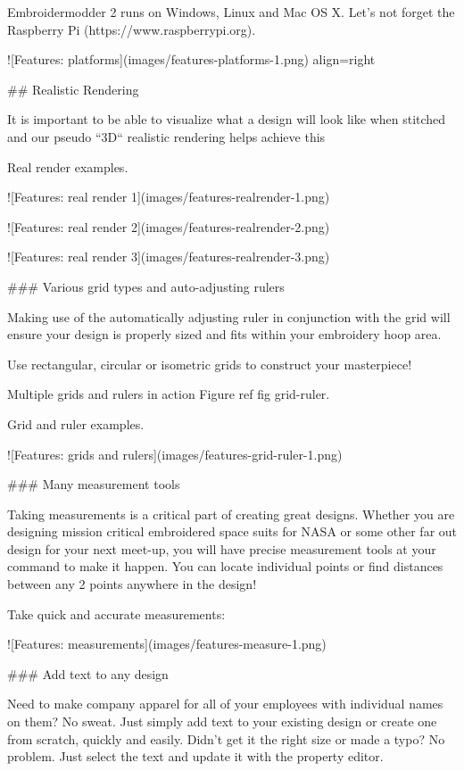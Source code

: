 Embroidermodder 2 runs on Windows, Linux and Mac OS X. Let's not forget the  Raspberry
Pi (https://www.raspberrypi.org).

![Features: platforms](images/features-platforms-1.png){ align=right }

## Realistic Rendering

It is important to be able to visualize what a design will look like when stitched and our
pseudo ``3D`` realistic rendering helps achieve this

Real render examples.

![Features: real render 1](images/features-realrender-1.png)

![Features: real render 2](images/features-realrender-2.png)

![Features: real render 3](images/features-realrender-3.png)

### Various grid types and auto-adjusting rulers

Making use of the automatically adjusting ruler in conjunction with the grid will ensure your
design is properly sized and fits within your embroidery hoop area.

Use rectangular, circular or isometric grids to construct your masterpiece!

Multiple grids and rulers in action Figure ref fig grid-ruler.

Grid and ruler examples.

![Features: grids and rulers](images/features-grid-ruler-1.png)

### Many measurement tools

Taking measurements is a critical part of creating great designs. Whether you are designing
mission critical embroidered space suits for NASA or some other far out design for your next
meet-up, you will have precise measurement tools at your command to make it happen. You can
locate individual points or find distances between any 2 points anywhere in the design!

Take quick and accurate measurements:

![Features: measurements](images/features-measure-1.png)

### Add text to any design

Need to make company apparel for all of your employees with individual names on them? No sweat.
Just simply add text to your existing design or create one from scratch, quickly and easily.
Didn't get it the right size or made a typo? No problem. Just select the text and update it
with the property editor.

